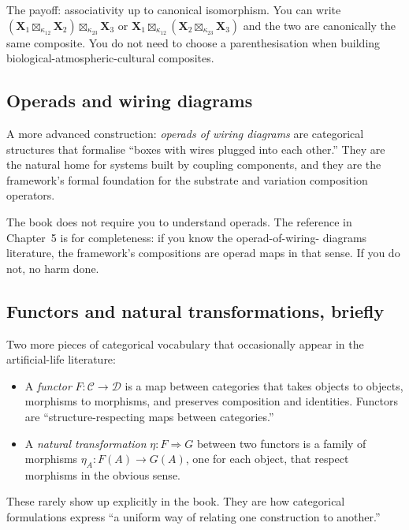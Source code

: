 The payoff: associativity up to canonical isomorphism. You can write
$(\mathbf{X}_1 \boxtimes_{\kappa_{12}} \mathbf{X}_2)
\boxtimes_{\kappa_{23}} \mathbf{X}_3$ or $\mathbf{X}_1
\boxtimes_{\kappa_{12}} (\mathbf{X}_2 \boxtimes_{\kappa_{23}}
\mathbf{X}_3)$ and the two are canonically the same composite. You
do not need to choose a parenthesisation when building
biological-atmospheric-cultural composites.

\subsection*{Operads and wiring diagrams}

A more advanced construction: \emph{operads of wiring diagrams} are
categorical structures that formalise ``boxes with wires plugged
into each other.'' They are the natural home for systems built by
coupling components, and they are the framework's formal foundation
for the substrate and variation composition operators.

The book does not require you to understand operads. The reference
in Chapter~5 is for completeness: if you know the operad-of-wiring-
diagrams literature, the framework's compositions are operad maps
in that sense. If you do not, no harm done.

\subsection*{Functors and natural transformations, briefly}

Two more pieces of categorical vocabulary that occasionally appear
in the artificial-life literature:

\begin{itemize}[leftmargin=1.5em,itemsep=2pt]
  \item A \emph{functor} $F : \mathcal{C} \to \mathcal{D}$ is a map
    between categories that takes objects to objects, morphisms to
    morphisms, and preserves composition and identities. Functors
    are ``structure-respecting maps between categories.''
  \item A \emph{natural transformation} $\eta : F \Rightarrow G$
    between two functors is a family of morphisms $\eta_A : F(A)
    \to G(A)$, one for each object, that respect morphisms in the
    obvious sense.
\end{itemize}

These rarely show up explicitly in the book. They are how
categorical formulations express ``a uniform way of relating one
construction to another.''

